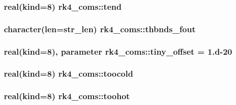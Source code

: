 \subsubsection[{\texorpdfstring{tend}{tend}}]{\setlength{\rightskip}{0pt plus 5cm}real(kind=8) rk4\+\_\+coms\+::tend}\hypertarget{namespacerk4__coms_a489d1f63edd639eb7a5c248163b59f9b}{}\label{namespacerk4__coms_a489d1f63edd639eb7a5c248163b59f9b}
\subsubsection[{\texorpdfstring{thbnds\+\_\+fout}{thbnds_fout}}]{\setlength{\rightskip}{0pt plus 5cm}character(len=str\+\_\+len) rk4\+\_\+coms\+::thbnds\+\_\+fout}\hypertarget{namespacerk4__coms_ab106d324ed571335ee763dd190e7430d}{}\label{namespacerk4__coms_ab106d324ed571335ee763dd190e7430d}
\subsubsection[{\texorpdfstring{tiny\+\_\+offset}{tiny_offset}}]{\setlength{\rightskip}{0pt plus 5cm}real(kind=8), parameter rk4\+\_\+coms\+::tiny\+\_\+offset = 1.d-\/20}\hypertarget{namespacerk4__coms_a3d0ca14edbf0ca895d40d7a9c49e75da}{}\label{namespacerk4__coms_a3d0ca14edbf0ca895d40d7a9c49e75da}
\subsubsection[{\texorpdfstring{toocold}{toocold}}]{\setlength{\rightskip}{0pt plus 5cm}real(kind=8) rk4\+\_\+coms\+::toocold}\hypertarget{namespacerk4__coms_ac687fa7b7b3d3a5b1d3bd179e62c8052}{}\label{namespacerk4__coms_ac687fa7b7b3d3a5b1d3bd179e62c8052}
\subsubsection[{\texorpdfstring{toohot}{toohot}}]{\setlength{\rightskip}{0pt plus 5cm}real(kind=8) rk4\+\_\+coms\+::toohot}\hypertarget{namespacerk4__coms_a759040e06196aa6e44844e731b1140ba}{}\label{namespacerk4__coms_a759040e06196aa6e44844e731b1140ba}
